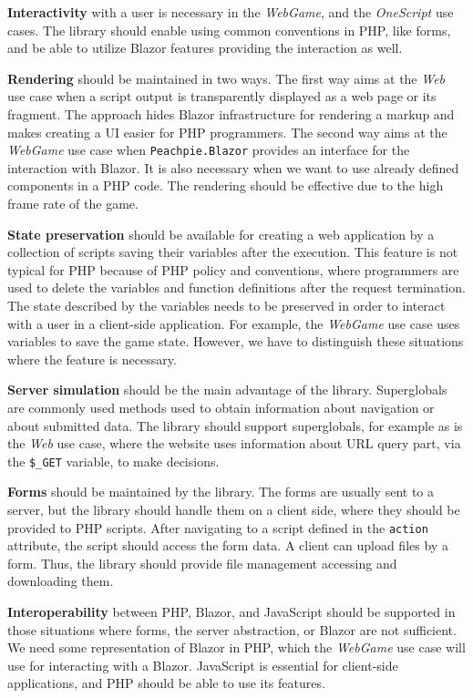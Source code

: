 \par
\textbf{Interactivity} with a user is necessary in the \textit{WebGame}, and the \textit{OneScript} use cases.
The library should enable using common conventions in PHP, like forms, and be able to utilize Blazor features providing the interaction as well.
\par
\textbf{Rendering} should be maintained in two ways.
The first way aims at the \textit{Web} use case when a script output is transparently displayed as a web page or its fragment.
The approach hides Blazor infrastructure for rendering a markup and makes creating a UI easier for PHP programmers.
The second way aims at the \textit{WebGame} use case when \texttt{Peachpie.Blazor} provides an interface for the interaction with Blazor.
It is also necessary when we want to use already defined components in a PHP code.
The rendering should be effective due to the high frame rate of the game.
\par
\textbf{State preservation} should be available for creating a web application by a collection of scripts saving their variables after the execution.
This feature is not typical for PHP because of PHP policy and conventions, where programmers are used to delete the variables and function definitions after the request termination.
The state described by the variables needs to be preserved in order to interact with a user in a client-side application. 
For example, the \textit{WebGame} use case uses variables to save the game state. 
However, we have to distinguish these situations where the feature is necessary.
\par
\textbf{Server simulation} should be the main advantage of the library.
Superglobals are commonly used methods used to obtain information about navigation or about submitted data.
The library should support superglobals, for example as is the \textit{Web} use case, where the website uses information about URL query part, via the \texttt{\$\_GET} variable, to make decisions.
\par
\textbf{Forms} should be maintained by the library. 
The forms are usually sent to a server, but the library should handle them on a client side, where they should be provided to PHP scripts.
After navigating to a script defined in the \texttt{action} attribute, the script should access the form data.
A client can upload files by a form.
Thus, the library should provide file management accessing and downloading them.
\par
\textbf{Interoperability} between PHP, Blazor, and JavaScript should be supported in those situations where forms, the server abstraction, or Blazor are not sufficient.
We need some representation of Blazor in PHP, which the \textit{WebGame} use case will use for interacting with a Blazor.
JavaScript is essential for client-side applications, and PHP should be able to use its features.

